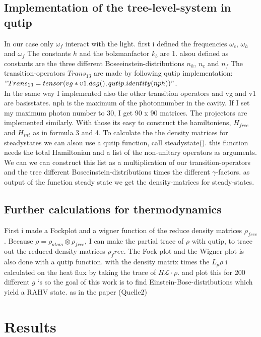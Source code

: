 \documentclass[12pt,a4paper]{article}
\begin{document}
\subsection{Implementation of the tree-level-system in qutip}
In our case only $\omega_f$ interact with the light. 
first i defined the frequencies $ \omega_c $, $ \omega_h$ and $ \omega_f$ 
The constants $h $ and the bolzmanfactor $k_b$ are 1.
alsou defined as constants are the three different Boseeinstein-distributions $n_h$, $n_c$ and $n_f$
The transition-operators $Trans_{13} $ are  made by following qutip implementation:\\ $"Trans_{13}=tensor(vg*v1.dag(),qutip.identity(nph))"$.\\
In the same way I implemented also the other transition operators and 
vg and v1 are basisstates.  nph is the maximum of the photonnumber in the cavity. If I set my maximum photon number to 30, I get 90 x 90 matrices. 
The projectors are implemented similarly. 
With those its easy to construct the hamiltoniens, $H_{free}$ and $H_{int}$ as in formula 3 and 4.
To calculate the the density matrices for steadystates we can alsou use a qutip function, call steadystate().
this function needs the total Hamiltonian and a list of the non-unitary operators as arguments.
We can we can construct this list as a multiplication of our transition-operators and the tree different Boseeinstein-distributions times the different $\gamma$-factors. 
as output of the function steady state we get the density-matrices for steady-states.
\subsection{Further calculations for thermodynamics}
First i made a Fockplot and a wigner function of the reduce density matrices $\rho_{free}$.
Because $\rho=\rho_{atom}\otimes \rho_{free}$, I can make the partial trace of $\rho$ with qutip, to trace out the reduced density matrices $\rho_free$. The Fock-plot and the Wigner-plot is also done with a qutip function.
with the density matrix times the $L_{p}\rho$ i calculated on the heat flux by taking the trace of $H \mathcal{L}\cdot \rho$. 
and plot this for 200 different  $g$ `s 
so the goal of this work is to find Einstein-Bose-distributions which yield a RAHV state.
as in the paper (Quelle2) 



\section{Results}
\end{document}

